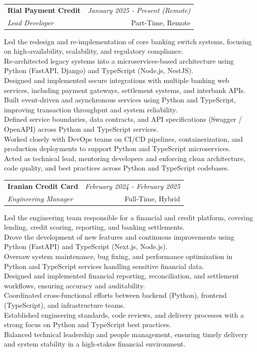 \documentclass[a4paper,10pt]{article}
\makeatletter
\newcommand{\resumeSubheading}[4]{
	\vspace{0.5mm}\item
	\begin{tabular*}{0.98\textwidth}[t]{l@{\extracolsep{\fill}}r}
		\textbf{#1} & \textit{\footnotesize{#4}} \\
		\textit{\footnotesize{#3}} &  \footnotesize{#2}\\
	\end{tabular*}
	\vspace{-2.4mm}
}
\newcommand{\resumeItemListStart}{\begin{justify}\begin{itemize}[leftmargin=3ex, rightmargin=2ex, noitemsep,labelsep=1.2mm,itemsep=0mm]\small}
\newcommand{\resumeItemListEnd}{\end{itemize}\end{justify}\vspace{-2mm}}
\makeatother
\begin{document}
\vspace{-1mm}
\resumeSubheading
{Rial Payment Credit}{Part-Time, Remote}
{Lead Developer}{January 2025 - Present (Remote)}
\resumeItemListStart
Led the redesign and re‑implementation of core banking switch systems, focusing on high‑availability, scalability, and regulatory compliance.\\
Re‑architected legacy systems into a microservices‑based architecture using Python (FastAPI, Django) and TypeScript (Node.js, NestJS).\\
Designed and implemented secure integrations with multiple banking web services, including payment gateways, settlement systems, and interbank APIs.\\
Built event‑driven and asynchronous services using Python and TypeScript, improving transaction throughput and system reliability.\\
Defined service boundaries, data contracts, and API specifications (Swagger / OpenAPI) across Python and TypeScript services.\\
Worked closely with DevOps teams on CI/CD pipelines, containerization, and production deployments to support Python and TypeScript microservices.\\
Acted as technical lead, mentoring developers and enforcing clean architecture, code quality, and best practices across Python and TypeScript codebases.
\resumeItemListEnd

\vspace{-1mm}
\resumeSubheading
{Iranian Credit Card}{Full-Time, Hybrid}
{Engineering Manager}{February 2024 - February 2025}
\resumeItemListStart
Led the engineering team responsible for a financial and credit platform, covering lending, credit scoring, reporting, and banking settlements.\\
Drove the development of new features and continuous improvements using Python (FastAPI) and TypeScript (Next.js, Node.js).\\
Oversaw system maintenance, bug fixing, and performance optimization in Python and TypeScript services handling sensitive financial data.\\
Designed and implemented financial reporting, reconciliation, and settlement workflows, ensuring accuracy and auditability.\\
Coordinated cross‑functional efforts between backend (Python), frontend (TypeScript), and infrastructure teams.\\
Established engineering standards, code reviews, and delivery processes with a strong focus on Python and TypeScript best practices.\\
Balanced technical leadership and people management, ensuring timely delivery and system stability in a high‑stakes financial environment.
\resumeItemListEnd
\end{document}
